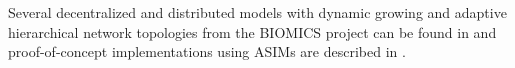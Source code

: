 Several decentralized and distributed models with dynamic growing and adaptive hierarchical network topologies from the BIOMICS project can be found in \cite{NehanivEtAl2015,BIOMICSD52} and proof-of-concept implementations using ASIMs are described in \cite{BIOMICSD52,Schrecklingetal2016}.















